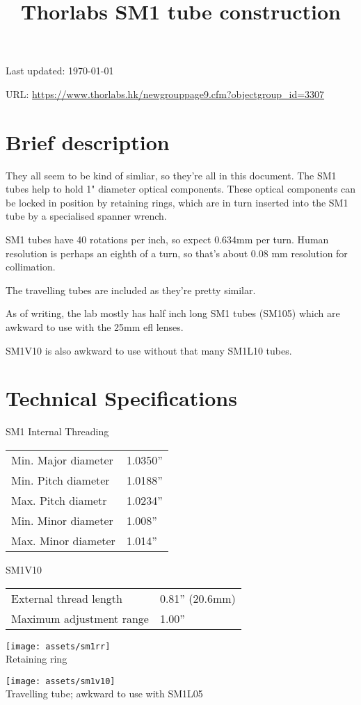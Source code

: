 \documentclass{article}
\title{\vspace{-4cm}Thorlabs SM1 tube construction}
\date{}
\begin{document}
\maketitle

\vspace{-1cm}

Last updated: \today

URL: \url{https://www.thorlabs.hk/newgrouppage9.cfm?objectgroup_id=3307}

\begin{multicols}{2}

\section{Brief description}

They all seem to be kind of simliar, so they're all in this document. The SM1 tubes help to hold 1" diameter optical components. These optical components can be locked in position by retaining rings, which are in turn inserted into the SM1 tube by a specialised spanner wrench.

SM1 tubes have 40 rotations per inch, so expect 0.634mm per turn. Human resolution is perhaps an eighth of a turn, so that's about 0.08 mm resolution for collimation.

The travelling tubes are included as they're pretty similar.

As of writing, the lab mostly has half inch long SM1 tubes (SM105) which are awkward to use with the 25mm efl lenses.

SM1V10 is also awkward to use without that many SM1L10 tubes.

\section{Technical Specifications}

SM1 Internal Threading

\begin{tabular}{|l|l|}
  Min. Major diameter & 1.0350''\\
  Min. Pitch diameter & 1.0188''\\
  Max. Pitch diametr & 1.0234'' \\
  Min. Minor diameter & 1.008''\\
  Max. Minor diameter & 1.014''
\end{tabular}%

\vspace{5mm}

\noindent SM1V10

\begin{tabular}{|l|l|}
External thread length & 0.81'' (20.6mm)\\
Maximum adjustment range & 1.00''
\end{tabular}%


\end{multicols}

\begin{center}
\texttt{[image: assets/sm1rr]} \\
Retaining ring
\end{center}


\begin{center}
\texttt{[image: assets/sm1v10]}\\
Travelling tube; awkward to use with SM1L05
\end{center}
\end{document}
